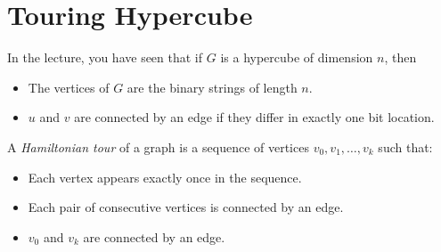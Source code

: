 \documentclass{article}
\begin{document}
\newpage

\section{Touring Hypercube}
In the lecture, you have seen that if $G$ is a hypercube of dimension $n$, then
\begin{itemize}
	\item The vertices of $G$ are the binary strings of length $n$.
	\item $u$ and $v$ are connected by an edge if they differ in exactly one bit location.
\end{itemize}

A \emph{Hamiltonian tour} of a graph is a sequence of vertices
$v_0, v_1, \ldots, v_k$ such that:
\begin{itemize}
	\item Each vertex appears exactly once in the sequence.
	\item Each pair of consecutive vertices is connected by an edge.
	\item $v_0$ and $v_k$ are connected by an edge.
\end{itemize}
\end{document}
